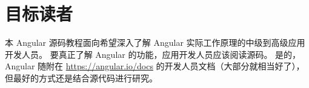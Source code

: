 \section{目标读者}


本 Angular 源码教程面向希望深入了解 Angular 实际工作原理的中级到高级应用开发人员。
要真正了解 Angular 的功能，应用开发人员应该阅读源码。
是的，Angular 随附在 \url{https://angular.io/docs} 的开发人员文档（大部分就相当好了），
但最好的方式还是结合源代码进行研究。